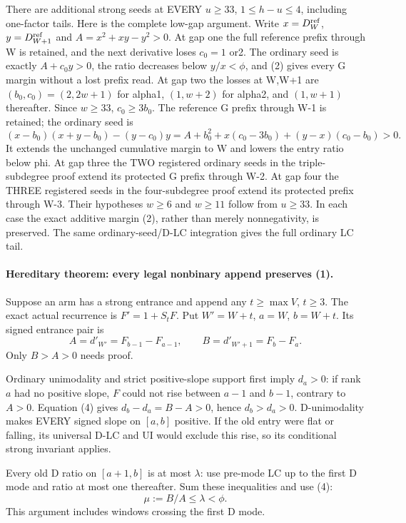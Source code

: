 There are additional strong seeds at EVERY $u\ge33$, $1\le h-u\le4$,
including one-factor tails. Here is the complete low-gap argument.
Write $x=D^{\rm ref}_W$, $y=D^{\rm ref}_{W+1}$ and
$A=x^2+xy-y^2>0$. At gap one the full reference prefix through W
is retained, and the next derivative loses $c_0=1$ or2. The ordinary
seed is exactly $A+c_0y>0$, the ratio decreases below $y/x<\phi$,
and (2) gives every G margin without a lost prefix read.
At gap two the losses at W,W+1 are
$(b_0,c_0)=(2,2w+1)$ for alpha1, $(1,w+2)$ for alpha2,
and $(1,w+1)$ thereafter. Since $w\ge33$, $c_0\ge3b_0$.
The reference G prefix through W-1 is retained; the ordinary seed is
\[
 (x-b_0)(x+y-b_0)-(y-c_0)y
 =A+b_0^2+x(c_0-3b_0)+(y-x)(c_0-b_0)>0.
\]
It extends the unchanged cumulative margin to W and lowers the entry
ratio below phi. At gap three the TWO registered ordinary seeds in
the triple-subdegree proof extend its protected G prefix through W-2.
At gap four the THREE registered seeds in the four-subdegree proof
extend its protected prefix through W-3. Their hypotheses $w\ge6$
and $w\ge11$ follow from $u\ge33$. In each case the exact additive
margin (2), rather than merely nonnegativity, is preserved. The same
ordinary-seed/D-LC integration gives the full ordinary LC tail.

\paragraph{Hereditary theorem: every legal nonbinary append preserves (1).}
Suppose an arm has a strong entrance and append any $t\ge\max V$,
$t\ge3$. The exact actual recurrence is $F'=1+S_tF$.
Put $W'=W+t$, $a=W$, $b=W+t$. Its signed entrance pair is
\[
 A=d'_{W'}=F_{b-1}-F_{a-1},\qquad
 B=d'_{W'+1}=F_b-F_a.                              \tag{4}
\]
Only $B>A>0$ needs proof.

Ordinary unimodality and strict positive-slope support first imply
$d_a>0$: if rank $a$ had no positive slope, $F$ could not rise
between $a-1$ and $b-1$, contrary to $A>0$.
Equation (4) gives $d_b-d_a=B-A>0$, hence $d_b>d_a>0$.
D-unimodality makes EVERY signed slope on $[a,b]$ positive.
If the old entry were flat or falling, its universal D-LC and UI
would exclude this rise, so its conditional strong invariant applies.

Every old D ratio on $[a+1,b]$ is at most $\lambda$: use pre-mode
LC up to the first D mode and ratio at most one thereafter.
Sum these inequalities and use (4):
\[
                     \mu:=B/A\le\lambda<\phi.       \tag{5}
\]
This argument includes windows crossing the first D mode.

